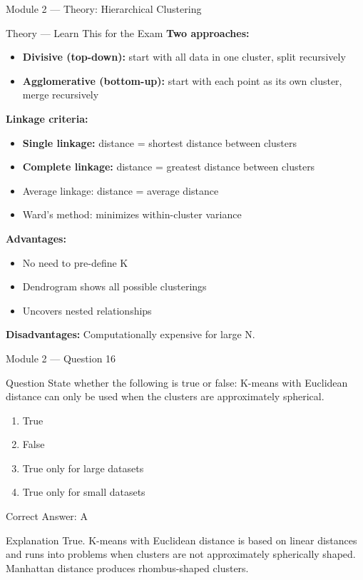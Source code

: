 \documentclass[aspectratio=169,10pt]{beamer}
\newcommand{\question}[1]{%
	\begin{block}{Question}
		#1
	\end{block}
}
\newcommand{\options}[4]{%
	\begin{enumerate}[label=\Alph*.,leftmargin=*]
		\item #1
		\item #2
		\item #3
		\item #4
	\end{enumerate}
}
\newcommand{\answerbox}[1]{%
	\begin{exampleblock}{Correct Answer: #1}
	\end{exampleblock}
}
\newcommand{\explain}[1]{%
	\begin{block}{Explanation}
		\small #1
	\end{block}
}
\newcommand{\theory}[1]{%
	\begin{block}{Theory --- Learn This for the Exam}
		\small #1
	\end{block}
}
\begin{document}
	\begin{frame}{Module 2 --- Theory: Hierarchical Clustering}
		\theory{
			\textbf{Two approaches:}
			\begin{itemize}
				\item \textbf{Divisive (top-down):} start with all data in one cluster, split recursively
				\item \textbf{Agglomerative (bottom-up):} start with each point as its own cluster, merge recursively
			\end{itemize}
			\textbf{Linkage criteria:}
			\begin{itemize}
				\item \textbf{Single linkage:} distance = shortest distance between clusters
				\item \textbf{Complete linkage:} distance = greatest distance between clusters
				\item Average linkage: distance = average distance
				\item Ward's method: minimizes within-cluster variance
			\end{itemize}
			\textbf{Advantages:}
			\begin{itemize}
				\item No need to pre-define K
				\item Dendrogram shows all possible clusterings
				\item Uncovers nested relationships
			\end{itemize}
			\textbf{Disadvantages:} Computationally expensive for large N.
		}
	\end{frame}
	
	\begin{frame}{Module 2 --- Question 16}
		\question{State whether the following is true or false: K-means with Euclidean distance can only be used when the clusters are approximately spherical.}
		\options{True}{False}{True only for large datasets}{True only for small datasets}
		\answerbox{A}
		\explain{True. K-means with Euclidean distance is based on linear distances and runs into problems when clusters are not approximately spherically shaped. Manhattan distance produces rhombus-shaped clusters.}
	\end{frame}
	
\end{document}

